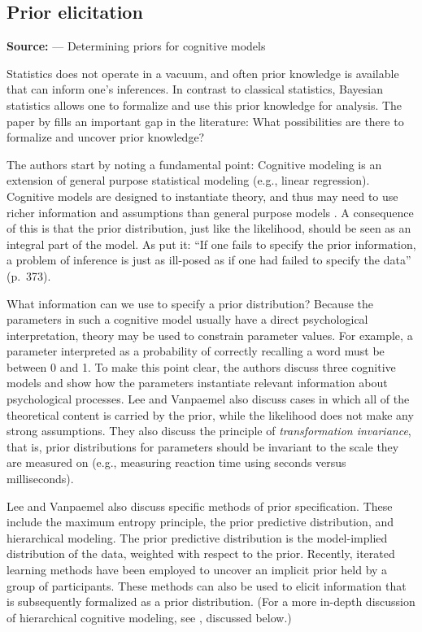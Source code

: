 \subsection{Prior elicitation}
\noindent\textbf{Source:}  --- Determining priors for cognitive models
\vspace{2mm}

Statistics does not operate in a vacuum, and often prior knowledge is available that can inform one's inferences. In contrast to classical statistics, Bayesian statistics allows one to formalize and use this prior knowledge for analysis. The paper by  fills an important gap in the literature: What possibilities are there to formalize and uncover prior knowledge?

The authors start by noting a fundamental point: Cognitive modeling \cite<as discussed in our final source,>{lee2008} is an extension of general purpose statistical modeling (e.g., linear regression). Cognitive models are designed to instantiate theory, and thus may need to use richer information and assumptions than general purpose models \cite<see also>{franke2016cogmod}. A consequence of this is that the prior distribution, just like the likelihood, should be seen as an integral part of the model. As  put it: ``If one fails to specify the prior information, a problem of inference is just as ill-posed as if one had failed to specify the data'' (p.~373). 

What information can we use to specify a prior distribution? Because the parameters in such a cognitive model usually have a direct psychological interpretation, theory may be used to constrain parameter values. For example, a parameter interpreted as a probability of correctly recalling a word must be between 0 and 1. To make this point clear, the authors discuss three cognitive models and show how the parameters instantiate relevant information about psychological processes.  Lee and Vanpaemel also discuss cases in which all of the theoretical content is carried by the prior, while the likelihood does not make any strong assumptions. They also discuss the principle of \textit{transformation invariance}, that is, prior distributions for parameters should be invariant to the scale they are measured on (e.g., measuring reaction time using seconds versus milliseconds). 

Lee and Vanpaemel also discuss specific methods of prior specification. These include the maximum entropy principle, the prior predictive distribution, and hierarchical modeling. The prior predictive distribution is the model-implied distribution of the data, weighted with respect to the prior. Recently, iterated learning methods have been employed to uncover an implicit prior held by a group of participants. These methods can also be used to elicit information that is subsequently formalized as a prior distribution. (For a more in-depth discussion of hierarchical cognitive modeling, see , discussed below.)

